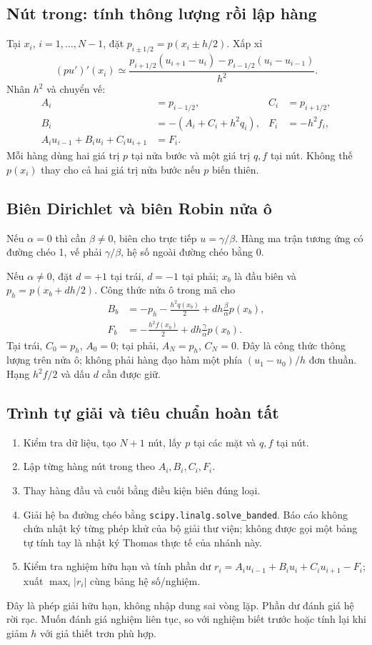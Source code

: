 \subsection{Nút trong: tính thông lượng rồi lập hàng}
Tại $x_i$, $i=1,\ldots,N-1$, đặt $p_{i\pm1/2}=p(x_i\pm h/2)$. Xấp xỉ
\[
 (pu')'(x_i)\simeq
 \frac{p_{i+1/2}(u_{i+1}-u_i)-p_{i-1/2}(u_i-u_{i-1})}{h^2}.
\]
Nhân $h^2$ và chuyển vế:
\begin{align*}
 A_i&=p_{i-1/2},&C_i&=p_{i+1/2},\\
 B_i&=-(A_i+C_i+h^2q_i),&F_i&=-h^2f_i,\\
 A_iu_{i-1}+B_iu_i+C_iu_{i+1}&=F_i.
\end{align*}
Mỗi hàng dùng hai giá trị $p$ tại nửa bước và một giá trị $q,f$ tại nút. Không thế $p(x_i)$ thay cho cả hai giá trị nửa bước nếu $p$ biến thiên.

\subsection{Biên Dirichlet và biên Robin nửa ô}
Nếu $\alpha=0$ thì cần $\beta\ne0$, biên cho trực tiếp $u=\gamma/\beta$. Hàng ma trận tương ứng có đường chéo 1, vế phải $\gamma/\beta$, hệ số ngoài đường chéo bằng 0.

Nếu $\alpha\ne0$, đặt $d=+1$ tại trái, $d=-1$ tại phải; $x_b$ là đầu biên và $p_h=p(x_b+dh/2)$. Công thức nửa ô trong mã cho
\begin{align*}
 B_b&=-p_h-\frac{h^2q(x_b)}2
          +dh\frac\beta\alpha p(x_b),\\
 F_b&=-\frac{h^2f(x_b)}2
          +dh\frac\gamma\alpha p(x_b).
\end{align*}
Tại trái, $C_0=p_h$, $A_0=0$; tại phải, $A_N=p_h$, $C_N=0$. Đây là công thức thông lượng trên nửa ô; không phải hàng đạo hàm một phía $(u_1-u_0)/h$ đơn thuần. Hạng $h^2f/2$ và dấu $d$ cần được giữ.

\subsection{Trình tự giải và tiêu chuẩn hoàn tất}
\begin{enumerate}
\item Kiểm tra dữ liệu, tạo $N+1$ nút, lấy $p$ tại các mặt và $q,f$ tại nút.
\item Lập từng hàng nút trong theo $A_i,B_i,C_i,F_i$.
\item Thay hàng đầu và cuối bằng điều kiện biên đúng loại.
\item Giải hệ ba đường chéo bằng \texttt{scipy.linalg.solve\_banded}. Báo cáo không chứa nhật ký từng phép khử của bộ giải thư viện; không được gọi một bảng tự tính tay là nhật ký Thomas thực tế của nhánh này.
\item Kiểm tra nghiệm hữu hạn và tính phần dư $r_i=A_iu_{i-1}+B_iu_i+C_iu_{i+1}-F_i$; xuất $\max_i|r_i|$ cùng bảng hệ số/nghiệm.
\end{enumerate}
Đây là phép giải hữu hạn, không nhập dung sai vòng lặp. Phần dư đánh giá hệ rời rạc. Muốn đánh giá nghiệm liên tục, so với nghiệm biết trước hoặc tính lại khi giảm $h$ với giả thiết trơn phù hợp.

